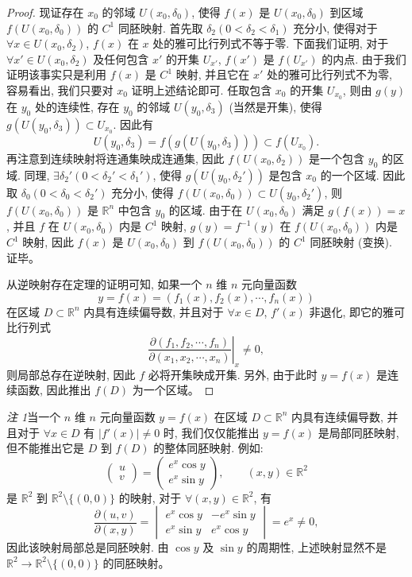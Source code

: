 \documentclass[UTF8,12pt,a4paper,fontset=fandol]{ctexart}
\begin{document}
\begin{proof}
现证存在 $x_0$ 的邻域 $U(x_0,\delta_0)$, 使得 $f(x)$ 是 $U(x_0,\delta_0)$ 到区域 $f(U(x_0,\delta_0))$ 的 $C^1$ 同胚映射. 首先取 $\delta_2(0<\delta_2<\delta_1)$ 充分小, 使得对于 $\forall x\in U(x_0,\delta_2)$, $f(x)$ 在 $x$ 处的雅可比行列式不等于零. 下面我们证明, 对于 $\forall x'\in U(x_0,\delta_2)$ 及任何包含 $x'$ 的开集 $U_{x'}$, $f(x')$ 是 $f(U_{x'})$ 的内点. 由于我们证明该事实只是利用 $f(x)$ 是 $C^1$ 映射, 并且它在 $x'$ 处的雅可比行列式不为零, 容易看出, 我们只要对 $x_0$ 证明上述结论即可. 任取包含 $x_0$ 的开集 $U_{x_0}$, 则由 $g(y)$ 在 $y_0$ 处的连续性, 存在 $y_0$ 的邻域 $U(y_0,\delta_3)$ (当然是开集), 使得 $g(U(y_0,\delta_3))\subset U_{x_0}$. 因此有
\[
  U(y_0,\delta_3)=f(g(U(y_0,\delta_3)))\subset f(U_{x_0}).
\]
再注意到连续映射将连通集映成连通集, 因此 $f(U(x_0,\delta_2))$ 是一个包含 $y_0$ 的区域. 同理, $\exists\delta_2'(0<\delta_2'<\delta_1')$, 使得 $g(U(y_0,\delta_2'))$ 是包含 $x_0$ 的一个区域. 因此取 $\delta_0(0<\delta_0<\delta_2')$ 充分小, 使得 $f(U(x_0,\delta_0))\subset U(y_0,\delta_2')$, 则 $f(U(x_0,\delta_0))$ 是 $\mathbb R^n$ 中包含 $y_0$ 的区域. 由于在 $U(x_0,\delta_0)$ 满足 $g(f(x))=x$, 并且 $f$ 在 $U(x_0,\delta_0)$ 内是 $C^1$ 映射, $g(y)=f^{-1}(y)$ 在 $f(U(x_0,\delta_0))$ 内是 $C^1$ 映射, 因此 $f(x)$ 是 $U(x_0,\delta_0)$ 到 $f(U(x_0,\delta_0))$ 的 $C^1$ 同胚映射 (变换). 证毕。

从逆映射存在定理的证明可知, 如果一个 $n$ 维 $n$ 元向量函数
\[
  y=f(x)=(f_1(x),f_2(x),\cdots,f_n(x))
\]
在区域 $D\subset\mathbb R^n$ 内具有连续偏导数, 并且对于 $\forall x\in D$, $f'(x)$ 非退化, 即它的雅可比行列式
\[
  \left.
  \frac{\partial(f_1,f_2,\cdots,f_n)}
       {\partial(x_1,x_2,\cdots,x_n)}
  \right|_x
  \ne0,
\]
则局部总存在逆映射, 因此 $f$ 必将开集映成开集. 另外, 由于此时 $y=f(x)$ 是连续函数, 因此推出 $f(D)$ 为一个区域。

\end{proof}
\noindent\emph{注 1}\quad 当一个 $n$ 维 $n$ 元向量函数 $y=f(x)$ 在区域 $D\subset\mathbb R^n$ 内具有连续偏导数, 并且对于 $\forall x\in D$ 有 $|f'(x)|\ne0$ 时, 我们仅仅能推出 $y=f(x)$ 是局部同胚映射, 但不能推出它是 $D$ 到 $f(D)$ 的整体同胚映射. 例如:
\[
  \begin{pmatrix}
    u\\
    v
  \end{pmatrix}
  =
  \begin{pmatrix}
    e^x\cos y\\
    e^x\sin y
  \end{pmatrix},
  \qquad (x,y)\in\mathbb R^2
\]
是 $\mathbb R^2$ 到 $\mathbb R^2\setminus\{(0,0)\}$ 的映射, 对于 $\forall(x,y)\in\mathbb R^2$, 有
\[
  \frac{\partial(u,v)}{\partial(x,y)}
  =
  \begin{vmatrix}
    e^x\cos y & -e^x\sin y\\
    e^x\sin y & e^x\cos y
  \end{vmatrix}
  =e^x\ne0,
\]
因此该映射局部总是同胚映射. 由 $\cos y$ 及 $\sin y$ 的周期性, 上述映射显然不是 $\mathbb R^2\to\mathbb R^2\setminus\{(0,0)\}$ 的同胚映射。
\end{document}
